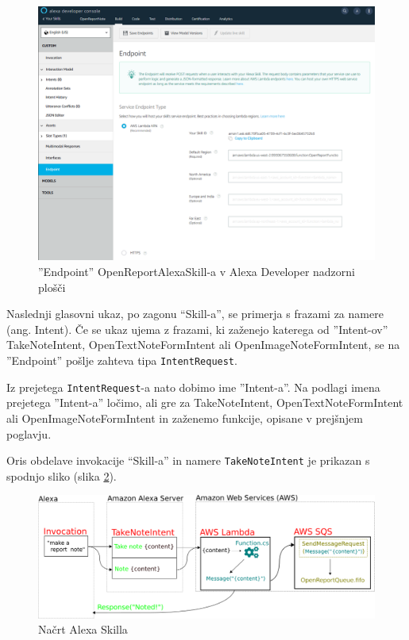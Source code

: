 \documentclass[a4paper, 12pt]{book}
\begin{document}
\begin{figure}[H]
\begin{center}
\includegraphics[width=13cm]{skill_endpoint}
\end{center}
\caption{''Endpoint'' OpenReportAlexaSkill-a v Alexa Developer nadzorni plošči}
\label{skill_endpoint}
\end{figure}

Naslednji glasovni ukaz, po zagonu \enquote{Skill-a}, se primerja s frazami za namere (ang. Intent).
Če se ukaz ujema z frazami, ki zaženejo katerega od ''Intent-ov'' TakeNoteIntent, OpenTextNoteFormIntent ali OpenImageNoteFormIntent, se na ''Endpoint'' pošlje zahteva tipa \texttt{IntentRequest}.

Iz prejetega \texttt{IntentRequest}-a nato dobimo ime ''Intent-a''.
Na podlagi imena prejetega ''Intent-a'' ločimo, ali gre za TakeNoteIntent, OpenTextNoteFormIntent ali OpenImageNoteFormIntent in zaženemo funkcije, opisane v prejšnjem poglavju.

Oris obdelave invokacije \enquote{Skill-a} in namere \texttt{TakeNoteIntent} je prikazan s spodnjo sliko (slika \ref{skill}).

\begin{figure}[H]
\begin{center}
\includegraphics[width=13.5cm]{skill_2}
\end{center}
\caption{Načrt Alexa Skilla}
\label{skill}
\end{figure}
\end{document}
